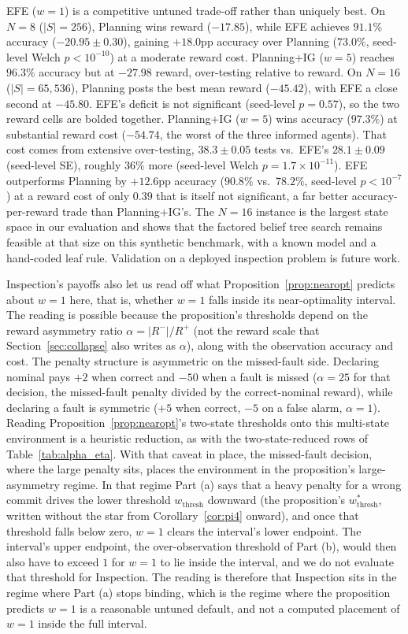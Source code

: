 EFE ($w{=}1$) is a competitive untuned trade-off rather than uniquely best. On $N{=}8$ ($|S|{=}256$), Planning wins reward ($-17.85$), while EFE achieves $91.1\%$ accuracy ($-20.95 \pm 0.30$), gaining $+18.0$pp accuracy over Planning ($73.0\%$, seed-level Welch $p<10^{-10}$) at a moderate reward cost. Planning+IG ($w{=}5$) reaches $96.3\%$ accuracy but at $-27.98$ reward, over-testing relative to reward. On $N{=}16$ ($|S|{=}65{,}536$), Planning posts the best mean reward ($-45.42$), with EFE a close second at $-45.80$. EFE's deficit is not significant (seed-level $p{=}0.57$), so the two reward cells are bolded together. Planning+IG ($w{=}5$) wins accuracy ($97.3\%$) at substantial reward cost ($-54.74$, the worst of the three informed agents). That cost comes from extensive over-testing, $38.3 \pm 0.05$ tests vs.\ EFE's $28.1 \pm 0.09$ (seed-level SE), roughly $36\%$ more (seed-level Welch $p{=}1.7{\times}10^{-11}$). EFE outperforms Planning by $+12.6$pp accuracy ($90.8\%$ vs.\ $78.2\%$, seed-level $p<10^{-7}$) at a reward cost of only $0.39$ that is itself not significant, a far better accuracy-per-reward trade than Planning+IG's. The $N{=}16$ instance is the largest state space in our evaluation and shows that the factored belief tree search remains feasible at that size on this synthetic benchmark, with a known model and a hand-coded leaf rule. Validation on a deployed inspection problem is future work.

Inspection's payoffs also let us read off what Proposition~\ref{prop:nearopt} predicts about $w{=}1$ here, that is, whether $w{=}1$ falls inside its near-optimality interval. The reading is possible because the proposition's thresholds depend on the reward asymmetry ratio $\alpha = |R^-|/R^+$ (not the reward scale that Section~\ref{sec:collapse} also writes as $\alpha$), along with the observation accuracy and cost. The penalty structure is asymmetric on the missed-fault side. Declaring nominal pays $+2$ when correct and $-50$ when a fault is missed ($\alpha = 25$ for that decision, the missed-fault penalty divided by the correct-nominal reward), while declaring a fault is symmetric ($+5$ when correct, $-5$ on a false alarm, $\alpha = 1$). Reading Proposition~\ref{prop:nearopt}'s two-state thresholds onto this multi-state environment is a heuristic reduction, as with the two-state-reduced rows of Table~\ref{tab:alpha_eta}. With that caveat in place, the missed-fault decision, where the large penalty sits, places the environment in the proposition's large-asymmetry regime. In that regime Part (a) says that a heavy penalty for a wrong commit drives the lower threshold $w_{\mathrm{thresh}}$ downward (the proposition's $w^*_{\mathrm{thresh}}$, written without the star from Corollary~\ref{cor:pi4} onward), and once that threshold falls below zero, $w{=}1$ clears the interval's lower endpoint. The interval's upper endpoint, the over-observation threshold of Part (b), would then also have to exceed $1$ for $w{=}1$ to lie inside the interval, and we do not evaluate that threshold for Inspection. The reading is therefore that Inspection sits in the regime where Part (a) stops binding, which is the regime where the proposition predicts $w{=}1$ is a reasonable untuned default, and not a computed placement of $w{=}1$ inside the full interval.

